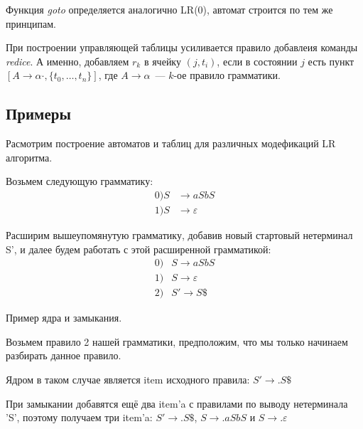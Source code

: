 Функция \textit{goto} определяется аналогично LR(0), автомат строится по тем же принципам.

При построении управляющей таблицы усиливается правило добавлеия команды \textit{redice}.
А именно, добавляем $r_k$ в ячейку $(j,t_i)$, если в состоянии $j$ есть пункт $[A \to \alpha \cdot, \{t_0, \dots, t_n\}]$, где $A \to \alpha$~--- $k$-ое правило грамматики.

\subsection{Примеры}

Расмотрим построение автоматов и таблиц для различных модефикаций LR алгоритма.

Возьмем следующую грамматику:
\begin{align*}
0) S & \rightarrow a S b S \\
1) S & \rightarrow \varepsilon
\end{align*}

Расширим вышеупомянутую грамматику, добавив новый стартовый нетерминал S', и далее будем работать с этой расширенной грамматикой:
\begin{align*}
0) & S \rightarrow a S b S \\
1) & S \rightarrow \varepsilon \\
2) & S' \rightarrow S \$
\end{align*}


\begin{example}
Пример ядра и замыкания. 

Возьмем правило 2 нашей грамматики, предположим, что мы только начинаем разбирать данное правило.

Ядром в таком случае является item исходного правила: $S' \rightarrow .S \$$

При замыкании добавятся ещё два item'a с правилами по выводу нетерминала 'S', поэтому получаем три item'a: $S' \rightarrow .S\$$, $S \rightarrow .aSbS$ и $S \rightarrow .\varepsilon$
\end{example}

